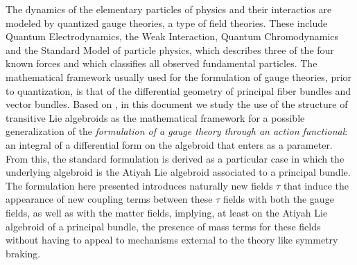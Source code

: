 
The dynamics of the elementary particles of physics and their interactios are modeled by quantized gauge theories, a type of field theories. These include Quantum Electrodynamics, the Weak Interaction, Quantum Chromodynamics and the Standard Model of particle physics, which describes three of the four known forces and which classifies all observed fundamental particles. The mathematical framework usually used for the formulation of gauge theories, prior to quantization, is that of the differential geometry of principal fiber bundles and vector bundles. Based on \cite{Fournel2013, Francois2014, Fournel2011, Lazzarini2012}, in this document we study the use of the structure of transitive Lie algebroids as the mathematical framework for a possible generalization of the \textit{formulation of a gauge theory through an action functional}: an integral of a differential form on the algebroid that enters as a parameter. From this, the standard formulation is derived as a particular case in which the underlying algebroid is the Atiyah Lie algebroid associated to a principal bundle. The formulation here presented introduces naturally new fields $\tau$ that induce the appearance of new coupling terms between these $\tau$ fields with both the gauge fields, as well as with the matter fields, implying, at least on the Atiyah Lie algebroid of a principal bundle, the presence of mass terms for these fields without having to appeal to mechanisms external to the theory like symmetry braking.


